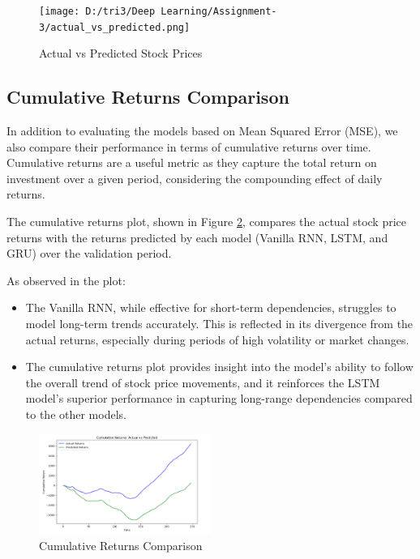 \documentclass[10pt,twocolumn,a4paper]{article}
\begin{document}
\begin{figure}[htbp]
    \centering
    \texttt{[image: D:/tri3/Deep Learning/Assignment-3/actual\_vs\_predicted.png]}
    \caption{Actual vs Predicted Stock Prices }
    \label{fig1: Implementation of AlexNet}
\end{figure}
\subsection{Cumulative Returns Comparison}
In addition to evaluating the models based on Mean Squared Error (MSE), we also compare their performance in terms of cumulative returns over time. Cumulative returns are a useful metric as they capture the total return on investment over a given period, considering the compounding effect of daily returns.

The cumulative returns plot, shown in Figure \ref{fig:cumulative_returns}, compares the actual stock price returns with the returns predicted by each model (Vanilla RNN, LSTM, and GRU) over the validation period.

As observed in the plot:
\begin{itemize}
    \item The Vanilla RNN, while effective for short-term dependencies, struggles to model long-term trends accurately. This is reflected in its divergence from the actual returns, especially during periods of high volatility or market changes.
    \item The cumulative returns plot provides insight into the model’s ability to follow the overall trend of stock price movements, and it reinforces the LSTM model’s superior performance in capturing long-range dependencies compared to the other models.
\end{itemize}

\begin{figure}[htbp]
    \centering
    \includegraphics[width=0.5\textwidth]{cumulative.png}
    \caption{Cumulative Returns Comparison}
    \label{fig:cumulative_returns}
\end{figure}
\end{document}
